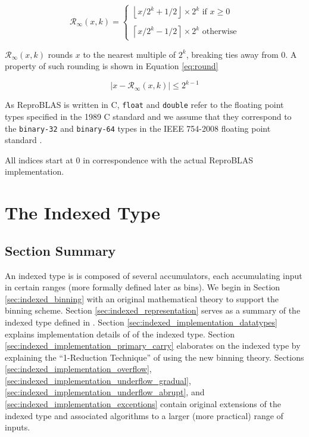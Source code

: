 \documentclass[12pt]{article}
\providecommand{\ceil}[1]{\left \lceil #1 \right \rceil }
\providecommand{\floor}[1]{\left \lfloor #1 \right \rfloor }
\providecommand{\roundtonearestinfty}{\ensuremath{\mathcal{R}_\text{$\infty$}}}
\theoremstyle{definition}
\numberwithin{equation}{section}
\begin{document}
  \begin{equation}
    \roundtonearestinfty(x, k) = \begin{cases}\floor{x/2^k + 1/2} \times 2^k \text{ if } x \geq 0\\ \\ \ceil{x/2^k - 1/2}\times 2^k \text{ otherwise}\end{cases}
  \end{equation}

  $\roundtonearestinfty(x, k)$ rounds $x$ to the nearest multiple of $2^k$, breaking ties away from 0. A property of such rounding is shown in Equation \ref{eq:round}

  \begin{equation}
    |x - \roundtonearestinfty(x, k)| \leq 2^{k - 1}
    \label{eq:round}
  \end{equation}

  As ReproBLAS is written in C, \verb|float| and \verb|double| refer to the floating point types specified in the 1989 C standard \cite{c89} and we assume that they correspond to the \verb|binary-32| and \verb|binary-64| types in the IEEE 754-2008 floating point standard \cite{ieee754}.

  All indices start at $0$ in correspondence with the actual ReproBLAS implementation.
\section{The Indexed Type}
  \label{sec:indexed}
  \subsection{Section Summary}
    An indexed type is is composed of several accumulators, each accumulating input in certain ranges (more formally defined later as bins). We begin in Section \ref{sec:indexed_binning} with an original mathematical theory to support the binning scheme. Section \ref{sec:indexed_representation} serves as a summary of the indexed type defined in \cite{repsum}.
    Section \ref{sec:indexed_implementation_datatypes} explains implementation details of \cite{repsum} of the indexed type. Section \ref{sec:indexed_implementation_primary_carry} elaborates on the indexed type by explaining the ``1-Reduction Technique'' of \cite{repsum} using the new binning theory.
    Sections \ref{sec:indexed_implementation_overflow}, \ref{sec:indexed_implementation_underflow_gradual}, \ref{sec:indexed_implementation_underflow_abrupt}, and \ref{sec:indexed_implementation_exceptions} contain original extensions of the indexed type and associated algorithms to a larger (more practical) range of inputs.
\end{document}

